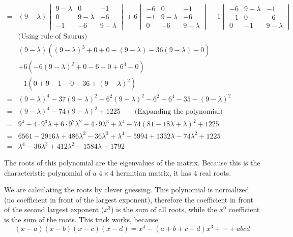 \documentclass[a4paper,german,12pt,smallheadings]{scrartcl}
\begin{document}
\begin{enumerate}[a)]
\begin{align*}
      = &(9-\lambda)
      \begin{vmatrix}
        9-\lambda & 0         & -1       \\
        0         & 9-\lambda & -6       \\
        -1        & -6        & 9-\lambda
      \end{vmatrix}
      +6
      \begin{vmatrix}
       -6 & 0         & -1         \\
       -1 & 9-\lambda & -6         \\
       0  & -6        & 9 - \lambda
      \end{vmatrix}
      -1
      \begin{vmatrix}
        -6 & 9 - \lambda & -1        \\
        -1 & 0           & -6        \\
        0  & -1          & 9-\lambda
      \end{vmatrix} \\
      &\text{(Using rule of Saurus)} \\
      = &(9-\lambda)((9-\lambda)^3+0+0-(9-\lambda)-36(9-\lambda)-0) \\
        &+6(-6(9-\lambda)^2+0-6-0+6^3-0) \\
        &-1(0+9-1-0+36+(9-\lambda)^2) \\
      = &(9-\lambda)^4-37(9-\lambda)^2
        -6^2(9-\lambda)^2-6^2+6^4
        -35-(9-\lambda)^2 \\
      = &(9-\lambda)^4-74(9-\lambda)^2+1225 
        \qquad\text{(Expanding the polynomial)} \\
      = &9^4-4\cdot9^3 \lambda + 6\cdot9^2\lambda^2-4\cdot9\lambda^3+\lambda^4-74(81-18\lambda+\lambda)^2+1225 \\
      = &6561-2916\lambda+486\lambda^2-36\lambda^3+\lambda^4-5994+1332\lambda-74\lambda^2+1225 \\
      = &\lambda^4-36\lambda^3+412\lambda^2-1584\lambda+1792
    \end{align*}

    The roots of this polynomial are the eigenvalues of the matrix. Because
    this is the characteristic polynomial of a $4 \times 4$ hermitian matrix,
    it has 4 real roots.

    We are calculating the roots by clever guessing. This polynomial is normalized
    (no coefficient in front of the largest exponent), therefore the
    coefficient in front of the second largest exponent ($x^3$) is the sum of
    all roots, while the $x^0$ coefficient is the sum of the roots.
    This trick works, because
    \begin{equation*}
      (x-a)(x-b)(x-c)(x-d) = x^4 -(a+b+c+d)x^3 + \cdots + abcd
    \end{equation*}



\end{enumerate}
\end{document}
